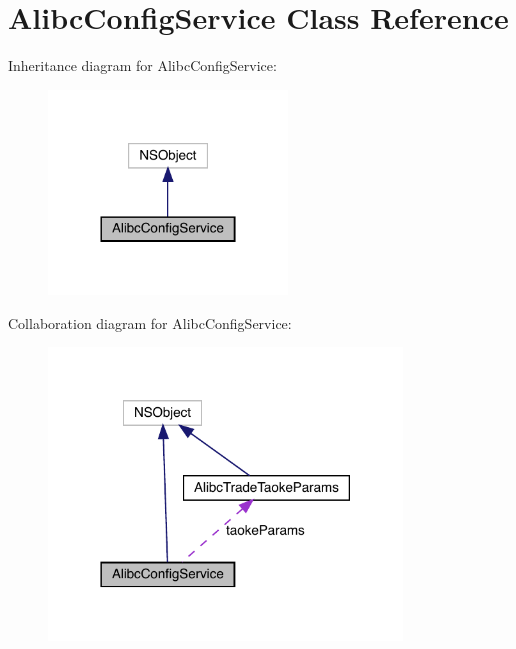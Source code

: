 \hypertarget{interface_alibc_config_service}{}\section{Alibc\+Config\+Service Class Reference}
\label{interface_alibc_config_service}


Inheritance diagram for Alibc\+Config\+Service\+:\nopagebreak
\begin{figure}[H]
\begin{center}
\leavevmode
\includegraphics[width=180pt]{interface_alibc_config_service__inherit__graph}
\end{center}
\end{figure}


Collaboration diagram for Alibc\+Config\+Service\+:\nopagebreak
\begin{figure}[H]
\begin{center}
\leavevmode
\includegraphics[width=266pt]{interface_alibc_config_service__coll__graph}
\end{center}
\end{figure}
